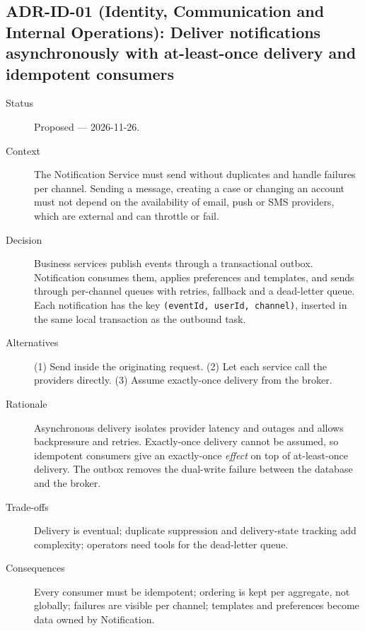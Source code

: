 \begingroup
\setlength{\emergencystretch}{3em}
\subsection{ADR-ID-01 (Identity, Communication and Internal Operations): Deliver notifications asynchronously with at-least-once delivery and idempotent consumers}
\begin{description}
  \item[Status] Proposed --- 2026-11-26.
  \item[Context] The Notification Service must send without duplicates and
    handle failures per channel. Sending a message, creating a case or
    changing an account must not depend on the availability of email, push
    or SMS providers, which are external and can throttle or fail.
  \item[Decision] Business services publish events through a transactional
    outbox. Notification consumes them, applies preferences and templates, and
    sends through per-channel queues with retries, fallback and a dead-letter
    queue. Each notification has the key \texttt{(eventId, userId, channel)},
    inserted in the same local transaction as the outbound task.
  \item[Alternatives] (1) Send inside the originating request. (2) Let each
    service call the providers directly. (3) Assume exactly-once delivery
    from the broker.
  \item[Rationale] Asynchronous delivery isolates provider latency and
    outages and allows backpressure and retries. Exactly-once delivery cannot
    be assumed, so idempotent consumers give an exactly-once \emph{effect}
    on top of at-least-once delivery. The outbox removes the dual-write
    failure between the database and the broker.
  \item[Trade-offs] Delivery is eventual; duplicate suppression and
    delivery-state tracking add complexity; operators need tools for the
    dead-letter queue.
  \item[Consequences] Every consumer must be idempotent; ordering is kept per
    aggregate, not globally; failures are visible per channel; templates and
    preferences become data owned by Notification.
\end{description}

\endgroup
